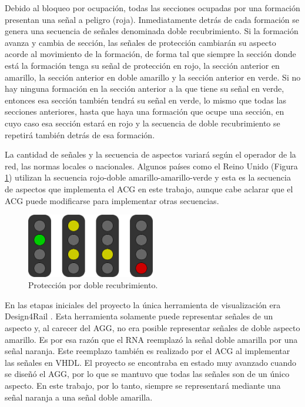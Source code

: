 	Debido al bloqueo por ocupación, todas las secciones ocupadas por una formación presentan una señal a peligro (roja). Inmediatamente detrás de cada formación se genera una secuencia de señales denominada doble recubrimiento. Si la formación avanza y cambia de sección, las señales de protección cambiarán su aspecto acorde al movimiento de la formación, de forma tal que siempre la sección donde está la formación tenga su señal de protección en rojo, la sección anterior en amarillo, la sección anterior en doble amarillo y la sección anterior en verde. Si no hay ninguna formación en la sección anterior a la que tiene su señal en verde, entonces esa sección también tendrá su señal en verde, lo mismo que todas las secciones anteriores, hasta que haya una formación que ocupe una sección, en cuyo caso esa sección estará en rojo y la secuencia de doble recubrimiento se repetirá también detrás de esa formación.
	 
	La cantidad de señales y la secuencia de aspectos variará según el operador de la red, las normas locales o nacionales. Algunos países como el Reino Unido \cite{UK} (Figura \ref{fig:uk_signalling}) utilizan la secuencia rojo-doble amarillo-amarillo-verde y esta es la secuencia de aspectos que implementa el ACG en este trabajo, aunque cabe aclarar que el ACG puede modificarse para implementar otras secuencias. 
	
	\begin{figure}[!h]
		\centering
		\includegraphics[width=0.5\textwidth]{Figuras/semaforo2}
		\centering\caption{Protección por doble recubrimiento.}
		\label{fig:uk_signalling}
	\end{figure}
	
	En las etapas iniciales del proyecto la única herramienta de visualización era Design4Rail \cite{DESIGN4RAIL}. Esta herramienta solamente puede representar señales de un aspecto y, al carecer del AGG, no era posible representar señales de doble aspecto amarillo. Es por esa razón que el RNA reemplazó la señal doble amarilla por una señal naranja. Este reemplazo también es realizado por el ACG al implementar las señales en VHDL. El proyecto se encontraba en estado muy avanzado cuando se diseñó el AGG, por lo que se mantuvo que todas las señales son de un único aspecto. En este trabajo, por lo tanto, siempre se representará mediante una señal naranja a una señal doble amarilla.
	
	

	
	